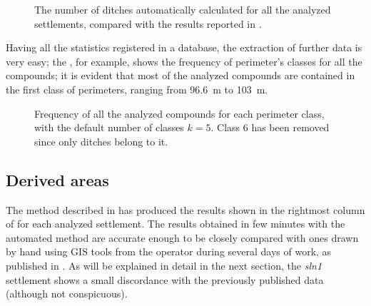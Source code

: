             \begin{figure}[H]
                \centering
                \begin{tikzpicture}
                    
                \end{tikzpicture}
                \caption[The number of ditches in \cite{laterza} compared to the results of the proposed method.]{The number of ditches automatically calculated for all the analyzed settlements, compared with the results reported in \cite{laterza}.}
                \label{fig:graph-num-ditch}
            \end{figure}

            Having all the statistics registered in a database, the extraction of further data is very easy; the , for example, shows the frequency of perimeter's classes for all the compounds; it is evident that most of the analyzed compounds are contained in the first class of perimeters, ranging from \SI{96.6}{\meter} to \SI{103}{\meter}.

            \begin{figure}
                \caption[Frequency of all the analyzed compounds for each perimeter class, with $k=5$.]{Frequency of all the analyzed compounds for each perimeter class, with the default number of classes $k=5$. Class $6$ has been removed since only ditches belong to it.}
                \begin{tikzpicture}
                    
                \end{tikzpicture}
                \label{fig:graph-perim-class}
            \end{figure}

        \subsection{Derived areas\label{sec:derived-areas}}

            The method described in  has produced the results shown in the rightmost column of  for each analyzed settlement. The results obtained in few minutes with the automated method are accurate enough to be closely compared with ones drawn by hand using GIS tools from the operator during several days of work, as published in \cite{laterza}.
            As will be explained in detail in the next section, the \emph{sln1} settlement shows a small discordance with the previously published data (although not conspicuous).

